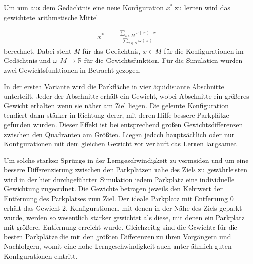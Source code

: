 Um nun aus dem Gedächtnis eine neue Konfiguration $x^*$ zu lernen wird das gewichtete arithmetische Mittel 

\begin{align}
	x^{*} &= \frac{\sum\limits_{x \in M} \omega (x) \cdot x}{\sum\limits_{x \in M} \omega (x)}\label{form_gelernterParameter}
\end{align}
 berechnet. Dabei steht $M$ für das Gedächtnis, $x\in M$ für die Konfigurationen im Gedächtnis und $\omega : M \rightarrow \mathbb{R}$ für die Gewichtsfunktion. Für die Simulation wurden zwei Gewichtsfunktionen in Betracht gezogen.

In der ersten Variante wird die Parkfläche in vier äquidistante Abschnitte unterteilt. Jeder der Abschnitte erhält ein Gewicht, wobei Abschnitte ein größeres Gewicht erhalten wenn sie näher am Ziel liegen. Die gelernte Konfiguration tendiert dann stärker in Richtung derer, mit deren Hilfe bessere Parkplätze gefunden wurden. Dieser Effekt ist bei entsprechend großen Gewichtsdifferenzen zwischen den Quadranten am Größten. Liegen jedoch hauptsächlich oder nur Konfigurationen mit dem gleichen Gewicht vor verläuft das Lernen langsamer. 

Um solche starken Sprünge in der Lerngeschwindigkeit zu vermeiden und um eine bessere Differenzierung zwischen den Parkplätzen nahe des Ziels zu gewährleisten wird in der hier durchgeführten Simulation jedem Parkplatz eine individuelle Gewichtung zugeordnet. Die Gewichte betragen jeweils den Kehrwert der Entfernung des Parkplatzes zum Ziel. Der ideale Parkplatz mit Entfernung $0$ erhält das Gewicht $2$. Konfigurationen, mit denen in der Nähe des Ziels geparkt wurde, werden so wesentlich stärker gewichtet als diese, mit denen ein Parkplatz mit größerer Entfernung erreicht wurde. Gleichzeitig sind die Gewichte für die besten Parkplätze die mit den größten Differenzen zu ihren Vorgängern und Nachfolgern, womit eine hohe Lerngeschwindigkeit auch unter ähnlich guten Konfigurationen eintritt. 
